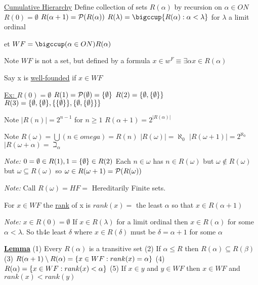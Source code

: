 \dfn \underline{Cumulative Hierarchy}
Define collection of sets $R(\alpha)$ by recursion on $\alpha \in ON$
$R(0) = \emptyset$
$R(\alpha+1) = \mathcal{P}(R(\alpha))$
$R(\lambda) = \bigccup \set{R(\alpha) : \alpha < \lambda}$ for $\lambda$ a limit ordinal

et $WF =  \bigccup(\alpha \in ON) R(\alpha)$

Note $WF$ is not a set, but defined by a formula $x \in w^F \equiv \exists \alpha x \in R(\alpha)$

\dfn Say x is \underline{well-founded} if $x \in WF$

\underline{Ex: }
$R(0) = \emptyset$
$R(1) = \mathcal{P}(\emptyset) = \{\emptyset\}$
$R(2) = \{\emptyset,\{\emptyset\}\}$
$R(3) = \{\emptyset, \{\emptyset\}, \{\{\emptyset\}\},\{\emptyset,\{\emptyset\}\}\} $

Note $|R(n)| = 2^{n-1}$ for $n \geq 1$
$R(\alpha+1) = 2^{|R(\alpha)|}$

Note $R(\omega) = \bigcup(n \in omega) = R(n)$
$|R(\omega)| = \aleph_0$
$|R(\omega+1)| = 2^{\aleph_0}$
$|R(\omega + \alpha) = \beth_\alpha$

\emph{Note: } $0 = \emptyset \in R(1), 1 = \{\emptyset\} \in R(2)$
Each $n \in \omega$ has $n \in R(\omega)$ but $\omega \notin R(\omega)$ but $\omega \subseteq R(\omega)$ so $\omega \in R(\omega+1) = \mathcal{P}(R(\omega))$

\emph{Note: } Call $R(\omega) = HF = $ Hereditarily Finite sets.

\dfn For $x \in WF$ the \underline{rank} of x is $rank(x) =$ the least $\alpha$ so that $x \in R(\alpha + 1)$

\emph{Note: } $x \in R(0) = \emptyset$
If $x \in R(\lambda)$ for a limit ordinal then $x \in R(\alpha)$ for some $\alpha < \lambda$.
So th4e least $\delta$ where $x \in R(\delta)$ must be $\delta = \alpha+1$ for some $\alpha$

\underline{\textbf{Lemma}}
(1) Every $R(\alpha)$ is a transitive set
(2) If $\alpha \leq R$ then $R(\alpha) \subseteq R(\beta)$
(3) $R(\alpha+1) \setminus R(\alpha) = \{x \in WF : rank(x) = \alpha\}$
(4) $R(\alpha) = \{x \in WF : rank(x) < \alpha\}$
(5) If $x \in y$ and $y \in WF$ then $x \in WF$ and $rank(x) < rank(y)$


